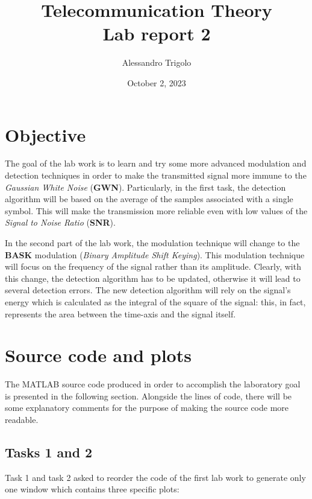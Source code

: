 \title{\vspace{160px} \textbf{\huge{Telecommunication Theory}} \\\vspace{17.5px} \LARGE{Lab report 2}  \vspace{10px}}
\author{Alessandro Trigolo}
\date{October 2, 2023}


\maketitle \newpage



\section*{Objective}
The goal of the lab work is to learn and try some more advanced modulation and detection techniques in order to make the transmitted signal more immune to the \textit{Gaussian White Noise} (\textbf{GWN}). Particularly, in the first task, the detection algorithm will be based on the average of the samples associated with a single symbol. This will make the transmission more reliable even with low values of the \textit{Signal to Noise Ratio} (\textbf{SNR}). 

In the second part of the lab work, the modulation technique will change to the \textbf{BASK} modulation (\textit{Binary Amplitude Shift Keying}). This modulation technique will focus on the frequency of the signal rather than its amplitude. Clearly, with this change, the detection algorithm has to be updated, otherwise it will lead to several detection errors. The new detection algorithm will rely on the signal's energy which is calculated as the integral of the square of the signal: this, in fact, represents the area between the time-axis and the signal itself.


% 
% 
\section*{Source code and plots}
The MATLAB source code produced in order to accomplish the laboratory goal is presented in the following section. Alongside the lines of code, there will be some explanatory comments for the purpose of making the source code more readable.
\lstset{style = MatLab}

\subsection*{Tasks 1 and 2}
Task 1 and task 2 asked to reorder the code of the first lab work to generate only one window which contains three specific plots:


